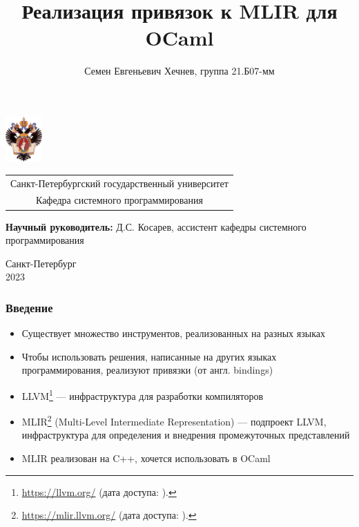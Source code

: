 \documentclass{beamer}
\title[MLIR OCaml]{Реализация привязок к MLIR для OCaml}
\institute[СПбГУ]{}
\author[Хечнев Семен]{Семен Евгеньевич Хечнев, группа 21.Б07-мм}
\begin{document}
{
\begin{frame}
	\includegraphics[width=1.4cm]{pictures/SPbGU_Logo.png}
	\vspace{-35pt}
	\hspace{-10pt}
	\begin{center}
		\begin{tabular}{c}
			\scriptsize{Санкт-Петербургский государственный университет} \\
			\scriptsize{Кафедра системного программирования}
		\end{tabular}
		\titlepage
	\end{center}

	\btVFill

	{\scriptsize
		\textbf{Научный руководитель:} Д.С. Косарев, ассистент кафедры системного программирования \\
	}
	\begin{center}
		\vspace{5pt}
		\scriptsize{Санкт-Петербург\\
			2023}
	\end{center}

\end{frame}
}

\begin{frame}[fragile]
	\frametitle{Введение}
	\begin{itemize}
		\item Существует множество инструментов, реализованных на разных языках
		\item Чтобы использовать решения, написанные на других языках программирования, реализуют привязки (от англ. bindings)
	\end{itemize}

	\begin{itemize}
		\item LLVM\footnote{\url{https://llvm.org/} (дата доступа:   ).} --- инфраструктура для разработки компиляторов
		\item MLIR\footnote{\url{https://mlir.llvm.org/} (дата доступа:   ).} (Multi-Level Intermediate Representation) --- подпроект LLVM, инфраструктура для определения и внедрения промежуточных представлений
		\item MLIR реализован на C++, хочется использовать в OCaml
	\end{itemize}
\end{frame}
\end{document}
